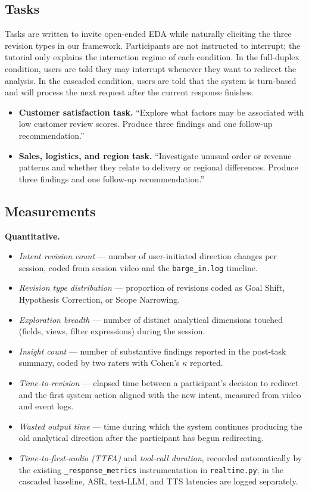 \documentclass[journal]{IEEEtran}
\begin{document}
\subsection{Tasks}
Tasks are written to invite open-ended EDA while naturally eliciting the three revision types in our framework. Participants are not instructed to interrupt; the tutorial only explains the interaction regime of each condition. In the full-duplex condition, users are told they may interrupt whenever they want to redirect the analysis. In the cascaded condition, users are told that the system is turn-based and will process the next request after the current response finishes.

\begin{itemize}
\item \textbf{Customer satisfaction task.} ``Explore what factors may be associated with low customer review scores. Produce three findings and one follow-up recommendation.''
\item \textbf{Sales, logistics, and region task.} ``Investigate unusual order or revenue patterns and whether they relate to delivery or regional differences. Produce three findings and one follow-up recommendation.''
\end{itemize}

\subsection{Measurements}
\textbf{Quantitative.}
\begin{itemize}
\item \emph{Intent revision count} --- number of user-initiated direction changes per session, coded from session video and the \texttt{barge\_in.log} timeline.
\item \emph{Revision type distribution} --- proportion of revisions coded as Goal Shift, Hypothesis Correction, or Scope Narrowing.
\item \emph{Exploration breadth} --- number of distinct analytical dimensions touched (fields, views, filter expressions) during the session.
\item \emph{Insight count} --- number of substantive findings reported in the post-task summary, coded by two raters with Cohen's $\kappa$ reported.
\item \emph{Time-to-revision} --- elapsed time between a participant's decision to redirect and the first system action aligned with the new intent, measured from video and event logs.
\item \emph{Wasted output time} --- time during which the system continues producing the old analytical direction after the participant has begun redirecting.
\item \emph{Time-to-first-audio (TTFA)} and \emph{tool-call duration}, recorded automatically by the existing \texttt{\_response\_metrics} instrumentation in \texttt{realtime.py}; in the cascaded baseline, ASR, text-LLM, and TTS latencies are logged separately.
\end{itemize}
\end{document}
